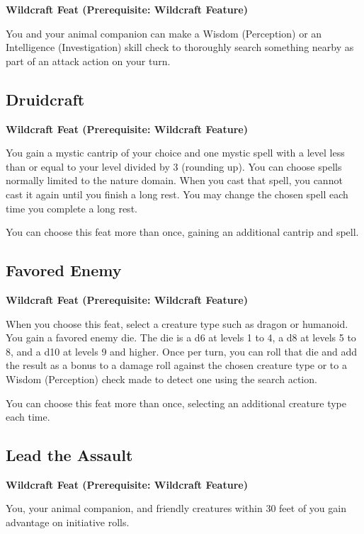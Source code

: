 \documentclass[12pt,letterpaper,twocolumn,openany,nodeprecatedcode,bg=none]{dndbook}
\begin{document}
\textbf{Wildcraft Feat (Prerequisite: Wildcraft Feature)}

You and your animal companion can make a Wisdom (Perception) or an
Intelligence (Investigation) skill check to thoroughly search something
nearby as part of an attack action on your turn.

\subsection{Druidcraft}\label{druidcraft}

\textbf{Wildcraft Feat (Prerequisite: Wildcraft Feature)}

You gain a mystic cantrip of your choice and one mystic spell with a
level less than or equal to your level divided by 3 (rounding up). You
can choose spells normally limited to the nature domain. When you cast
that spell, you cannot cast it again until you finish a long rest. You
may change the chosen spell each time you complete a long rest.

You can choose this feat more than once, gaining an additional cantrip
and spell.

\subsection{Favored Enemy}\label{favored-enemy}

\textbf{Wildcraft Feat (Prerequisite: Wildcraft Feature)}

When you choose this feat, select a creature type such as dragon or
humanoid. You gain a favored enemy die. The die is a d6 at levels 1 to
4, a d8 at levels 5 to 8, and a d10 at levels 9 and higher. Once per
turn, you can roll that die and add the result as a bonus to a damage
roll against the chosen creature type or to a Wisdom (Perception) check
made to detect one using the search action.

You can choose this feat more than once, selecting an additional
creature type each time.

\clearpage

\subsection{Lead the Assault}\label{lead-the-assault}

\textbf{Wildcraft Feat (Prerequisite: Wildcraft Feature)}

You, your animal companion, and friendly creatures within 30 feet of you
gain advantage on initiative rolls.
\end{document}
